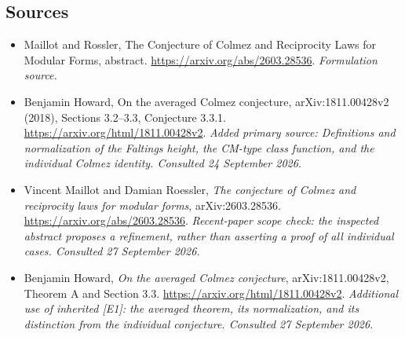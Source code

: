 \documentclass[11pt]{article}
\begin{document}
\subsection{Sources}
\begin{itemize}
\item[S1]Maillot and Rossler, The Conjecture of Colmez and Reciprocity Laws for Modular Forms, abstract.
\url{https://arxiv.org/abs/2603.28536}.
\textit{Formulation source.}
\item[E1]Benjamin Howard, On the averaged Colmez conjecture, arXiv:1811.00428v2 (2018), Sections 3.2–3.3, Conjecture 3.3.1.
\url{https://arxiv.org/html/1811.00428v2}.
\textit{Added primary source: Definitions and normalization of the Faltings height, the CM-type class function, and the individual Colmez identity. Consulted 24 September 2026.}
\item[E2]Vincent Maillot and Damian Roessler, \emph{The conjecture of
Colmez and reciprocity laws for modular forms}, arXiv:2603.28536.
\url{https://arxiv.org/abs/2603.28536}.
\textit{Recent-paper scope check: the inspected abstract proposes a
refinement, rather than asserting a proof of all individual cases.
Consulted 27 September 2026.}
\item[E3]Benjamin Howard, \emph{On the averaged Colmez conjecture},
arXiv:1811.00428v2, Theorem A and Section 3.3.
\url{https://arxiv.org/html/1811.00428v2}.
\textit{Additional use of inherited [E1]: the averaged theorem, its
normalization, and its distinction from the individual conjecture.
Consulted 27 September 2026.}

\end{itemize}
\end{document}
